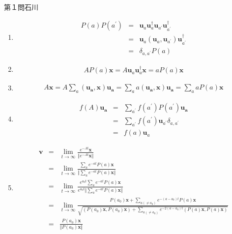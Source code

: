 \newcommand{\trd}[1]{{}^{\dag}\hspace{-1mm}#1}
\newcommand{\pdif}[2]{\frac{\partial #1}{\partial #2}}

\begin{answer}{第１問}{石川}
\begin{enumerate}
\item 
  \begin{eqnarray}
  P(a)P(a^{\prime} )&=&\bm{u}_a\bm{u}_{a}^{\dag}\bm{u}_{a^{\prime}}\bm{u}_{a^{\prime} }^{\dag}\\
		  &=& \bm{u}_a(\bm{u}_a,\bm{u}_{a^{\prime} })\bm{u}_{a^{\prime} }^{\dag}\\
                  &=& \delta_{a,a^{\prime} }P(a)
  \end{eqnarray}
\item 
  \begin{eqnarray}
  AP(a)\bm{x} = A\bm{u}_a\bm{u}_{a}^{\dag}\bm{x} = aP(a)\bm{x}
  \end{eqnarray}
\item 
  \begin{eqnarray}
  A\bm{x} = A\sum_a(\bm{u_a},\bm{x})\bm{u_a} = \sum_a a(\bm{u_a},\bm{x})\bm{u_a} = \sum_a aP(a)\bm{x}
  \end{eqnarray}
\item 
  \begin{eqnarray}
  f(A)\bm{u_a} &=& \sum_{a^{\prime}} f(a^{\prime} )P(a^{\prime} )\bm{u_a}\\
		  &=& \sum_{a^{\prime}} f(a^{\prime} )\bm{u}_{a^{\prime}}\delta_{a,a^{\prime}}\\
                  &=& f(a)\bm{u}_a
  \end{eqnarray}
\item 
  \begin{eqnarray}
  \bm{v} &=& \lim_{t\rightarrow \infty} \frac{e^{-At}\bm{x}}{\Vert e^{-At}\bm{x}\Vert}\\
	  &=& \lim_{t\rightarrow \infty} \frac{\sum_{a}e^{-at}P(a)\bm{x}}{\Vert \sum_{a}e^{-at}P(a)\bm{x}\Vert}\\
          &=& \lim_{t\rightarrow \infty} \frac{e^{a_0t}\sum_{a}e^{-at}P(a)\bm{x}}{e^{a_0t}\Vert \sum_{a}e^{-at}P(a)\bm{x}\Vert}\\
          &=& \lim_{t\rightarrow \infty} \frac{P(a_0)\bm{x}+\sum_{a(\neq a_0)}e^{-(a-a_0)t}P(a)\bm{x}}{\sqrt{(P(a_0)\bm{x},P(a_0)\bm{x})+\sum_{a(\neq a_0)}e^{-2(a-a_0)t}(P(a)\bm{x},P(a)\bm{x})}}\\
          &=& \frac{P(a_0)\bm{x}}{\Vert P(a_0)\bm{x}\Vert }
  \end{eqnarray}
\end{enumerate}
\end{answer}

